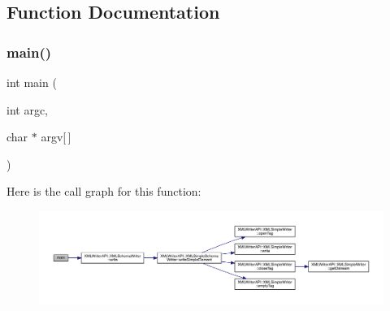 \subsection{Function Documentation}
\mbox{\label{adat-devel_2other__libs_2xpath__reader_2examples_2schema__writer__test_8cc_a0ddf1224851353fc92bfbff6f499fa97}} 
\subsubsection{\texorpdfstring{main()}{main()}}
{\footnotesize\ttfamily int main (\begin{DoxyParamCaption}\item[{int}]{argc,  }\item[{char $\ast$}]{argv\mbox{[}$\,$\mbox{]} }\end{DoxyParamCaption})}

Here is the call graph for this function\+:
\nopagebreak
\begin{figure}[H]
\begin{center}
\leavevmode
\includegraphics[width=350pt]{d0/da5/adat-devel_2other__libs_2xpath__reader_2examples_2schema__writer__test_8cc_a0ddf1224851353fc92bfbff6f499fa97_cgraph}
\end{center}
\end{figure}
